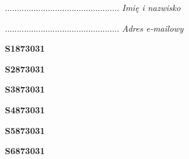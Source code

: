 \begin{turn}{90}\begin{minipage}{\linewidth} \vspace{20mm} ................................................  \textit{Imię i nazwisko}\end{minipage}\end{turn}

\begin{turn}{90}\begin{minipage}{\linewidth} \vspace{20mm} ................................................  \textit{Adres e-mailowy}\end{minipage}\end{turn}

\begin{turn}{90}\huge \begin{minipage}{\linewidth} \vspace{10mm}\textbf{S1873031}\end{minipage}\end{turn}

\begin{turn}{90}\huge \begin{minipage}{\linewidth} \vspace{10mm}\textbf{S2873031}\end{minipage}\end{turn}

\begin{turn}{90}\huge \begin{minipage}{\linewidth} \vspace{10mm}\textbf{S3873031}\end{minipage}\end{turn}

\begin{turn}{90}\huge \begin{minipage}{\linewidth} \vspace{10mm}\textbf{S4873031}\end{minipage}\end{turn}

\begin{turn}{90}\huge \begin{minipage}{\linewidth} \vspace{10mm}\textbf{S5873031}\end{minipage}\end{turn}

\begin{turn}{90}\huge \begin{minipage}{\linewidth} \vspace{10mm}\textbf{S6873031}\end{minipage}\end{turn}

